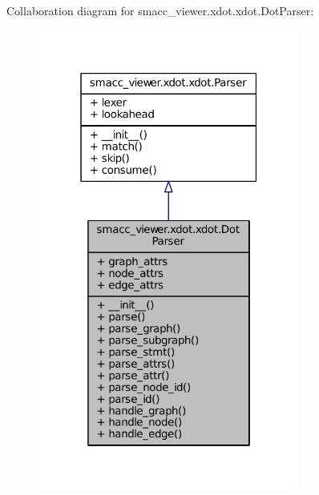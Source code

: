 Collaboration diagram for smacc\+\_\+viewer.\+xdot.\+xdot.\+Dot\+Parser\+:
\nopagebreak
\begin{figure}[H]
\begin{center}
\leavevmode
\includegraphics[width=244pt]{classsmacc__viewer_1_1xdot_1_1xdot_1_1DotParser__coll__graph}
\end{center}
\end{figure}
